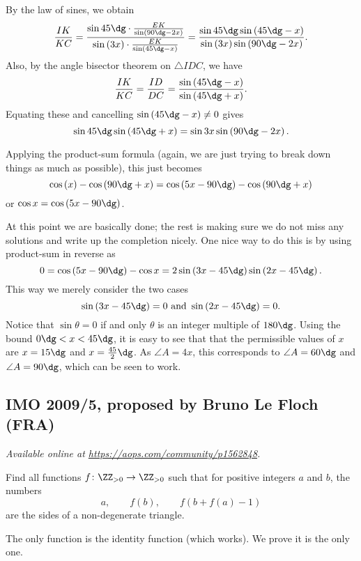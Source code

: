 \documentclass[11pt]{scrartcl}
\begin{document}
By the law of sines, we obtain
\[ \frac{IK}{KC} = \frac%
  {\sin 45\dg \cdot \frac{EK}{\sin \left( 90\dg - 2x \right)}}%
  {\sin \left( 3x \right) \cdot \frac{EK}{\sin \left( 45\dg-x \right)}}
  = \frac{\sin 45\dg \sin \left( 45\dg - x \right)}%
  {\sin \left( 3x \right) \sin \left( 90\dg - 2x \right)}. \]
Also, by the angle bisector theorem on $\triangle IDC$,
we have
\[ \frac{IK}{KC} = \frac{ID}{DC}
  = \frac{\sin \left( 45\dg-x \right)}{\sin\left( 45\dg+x \right)}. \]
Equating these and cancelling $\sin \left( 45\dg-x \right) \neq 0$ gives
\[ \sin 45\dg \sin \left( 45\dg + x \right)
  = \sin 3x \sin \left( 90\dg - 2x \right). \]

Applying the product-sum formula
(again, we are just trying to break down things as much as possible),
this just becomes
\[ \cos\left( x \right) - \cos \left( 90\dg + x \right)
  = \cos \left( 5x-90\dg \right) - \cos \left( 90\dg+x \right) \]
or $\cos x = \cos \left( 5x-90\dg \right)$.

At this point we are basically done;
the rest is making sure we do not miss any solutions
and write up the completion nicely.
One nice way to do this is by using product-sum in reverse as
\[ 0 = \cos \left( 5x-90\dg \right) - \cos x
  = 2 \sin \left( 3x - 45\dg \right) \sin \left( 2x-45\dg \right). \]
This way we merely consider the two cases
\[ \sin \left( 3x-45\dg \right) = 0 \text{ and }
  \sin \left( 2x - 45\dg \right) = 0. \]
Notice that $\sin\theta = 0$ if and only $\theta$
is an integer multiple of $180\dg$.
Using the bound $0\dg < x < 45\dg$,
it is easy to see that that the permissible values of $x$
are $x = 15\dg$ and $x = \frac{45}{2}\dg$.
As $\angle A = 4x$, this corresponds to $\angle A = 60\dg$
and $\angle A = 90\dg$, which can be seen to work.
\pagebreak

\subsection{IMO 2009/5, proposed by Bruno Le Floch (FRA)}
\textsl{Available online at \url{https://aops.com/community/p1562848}.}
\begin{mdframed}[style=mdpurplebox,frametitle={Problem statement}]
Find all functions $f \colon \ZZ_{>0} \to \ZZ_{>0}$
such that for positive integers $a$ and $b$, the numbers
\[ a, \qquad f(b), \qquad f(b+f(a)-1) \]
are the sides of a non-degenerate triangle.
\end{mdframed}
The only function is the identity function (which works).
We prove it is the only one.
\end{document}
